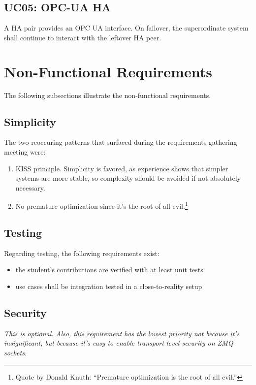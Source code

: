 \subsection{UC05: OPC-UA HA}
A HA pair provides an OPC UA interface. On failover, the superordinate system
shall continue to interact with the leftover HA peer.

\section{Non-Functional Requirements}
The following subsections illustrate the non-functional requirements.

\subsection{Simplicity}
The two reoccuring patterns that surfaced during the requirements gathering
meeting were:

\begin{enumerate}
\item \gls{KISS} principle. Simplicity is favored, as experience shows that
	simpler systems are more stable, so complexity should be avoided if not
	absolutely necessary.

\item No premature optimization since it's the root of all evil.\footnote{Quote
	by Donald Knuth: ``Premature optimization is the root of all evil.''}
\end{enumerate}


\subsection{Testing}
Regarding testing, the following requirements exist:
\begin{itemize}
	\item the student's contributions are verified with at least unit tests
	\item use cases shall be integration tested in a close-to-reality setup
\end{itemize}

\subsection{Security}
\emph{This is optional. Also, this requirement has the lowest priority not
because it's insignificant, but because it's easy to enable transport level
security on ZMQ sockets.}

